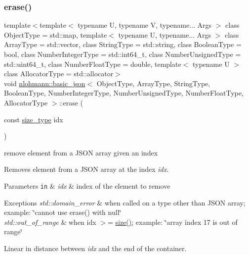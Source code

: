 \subsubsection{\texorpdfstring{erase()}{erase()}\hspace{0.1cm}{\footnotesize\ttfamily [4/4]}}
{\footnotesize\ttfamily template$<$template$<$ typename U, typename V, typename... Args $>$ class Object\+Type = std\+::map, template$<$ typename U, typename... Args $>$ class Array\+Type = std\+::vector, class String\+Type  = std\+::string, class Boolean\+Type  = bool, class Number\+Integer\+Type  = std\+::int64\+\_\+t, class Number\+Unsigned\+Type  = std\+::uint64\+\_\+t, class Number\+Float\+Type  = double, template$<$ typename U $>$ class Allocator\+Type = std\+::allocator$>$ \\
void \hyperlink{classnlohmann_1_1basic__json}{nlohmann\+::basic\+\_\+json}$<$ Object\+Type, Array\+Type, String\+Type, Boolean\+Type, Number\+Integer\+Type, Number\+Unsigned\+Type, Number\+Float\+Type, Allocator\+Type $>$\+::erase (\begin{DoxyParamCaption}\item[{const \hyperlink{classnlohmann_1_1basic__json_a1579a8f72a230358d6cd1a6e8a62859b}{size\+\_\+type}}]{idx }\end{DoxyParamCaption})\hspace{0.3cm}{\ttfamily [inline]}}



remove element from a J\+S\+ON array given an index 

Removes element from a J\+S\+ON array at the index {\itshape idx}.


\begin{DoxyParams}[1]{Parameters}
\mbox{\tt in}  & {\em idx} & index of the element to remove\\
\hline
\end{DoxyParams}

\begin{DoxyExceptions}{Exceptions}
{\em std\+::domain\+\_\+error} & when called on a type other than J\+S\+ON array; example\+: {\ttfamily \char`\"{}cannot use erase() with null\char`\"{}} \\
\hline
{\em std\+::out\+\_\+of\+\_\+range} & when {\ttfamily idx $>$= \hyperlink{classnlohmann_1_1basic__json_a0ea8a1ecca4b3cb0ba09ad7552c364b6}{size()}}; example\+: {\ttfamily \char`\"{}array index 17
is out of range\char`\"{}}\\
\hline
\end{DoxyExceptions}
Linear in distance between {\itshape idx} and the end of the container.

